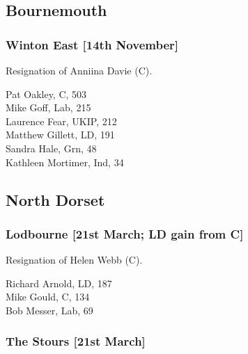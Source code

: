 \documentclass[a4paper,openany,10pt]{book}
\begin{document}
\subsection*{Bournemouth}

\subsubsection*{Winton East \hspace*{\fill}\nolinebreak[1]%
\enspace\hspace*{\fill}
[14th November]}


Resignation of Anniina Davie (C).



Pat Oakley, C, 503\\
Mike Goff, Lab, 215\\
Laurence Fear, UKIP, 212\\
Matthew Gillett, LD, 191\\
Sandra Hale, Grn, 48\\
Kathleen Mortimer, Ind, 34\\


\subsection*{North Dorset}

\subsubsection*{Lodbourne \hspace*{\fill}\nolinebreak[1]%
\enspace\hspace*{\fill}
[21st March; LD gain from C]}


Resignation of Helen Webb (C).



Richard Arnold, LD, 187\\
Mike Gould, C, 134\\
Bob Messer, Lab, 69\\


\subsubsection*{The Stours \hspace*{\fill}\nolinebreak[1]%
\enspace\hspace*{\fill}
[21st March]}
\end{document}
